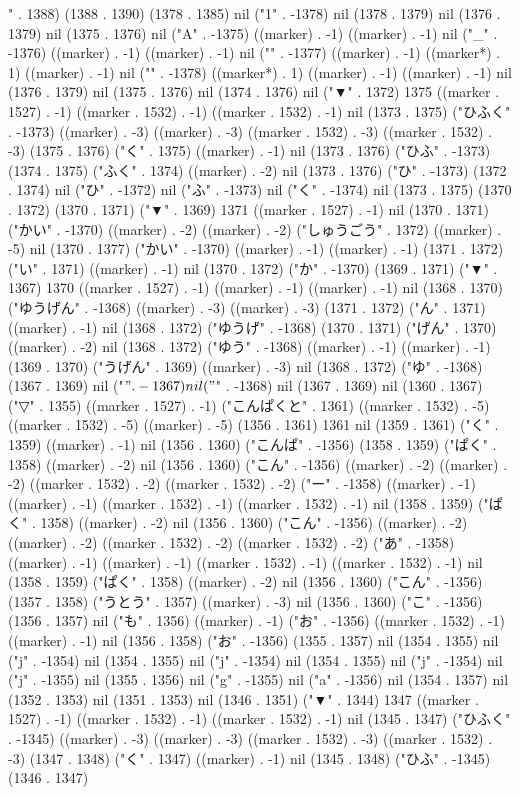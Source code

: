 " . 1388) (1388 . 1390) (1378 . 1385) nil ("1" . -1378) nil (1378 . 1379) nil (1376 . 1379) nil (1375 . 1376) nil ("A" . -1375) ((marker) . -1) ((marker) . -1) nil ("_" . -1376) ((marker) . -1) ((marker) . -1) nil ("{" . -1377) ((marker) . -1) ((marker*) . 1) ((marker) . -1) nil ("}" . -1378) ((marker*) . 1) ((marker) . -1) ((marker) . -1) nil (1376 . 1379) nil (1375 . 1376) nil (1374 . 1376) nil ("▼" . 1372) 1375 ((marker . 1527) . -1) ((marker . 1532) . -1) ((marker . 1532) . -1) nil (1373 . 1375) ("ひふく" . -1373) ((marker) . -3) ((marker) . -3) ((marker . 1532) . -3) ((marker . 1532) . -3) (1375 . 1376) ("く" . 1375) ((marker) . -1) nil (1373 . 1376) ("ひふ" . -1373) (1374 . 1375) ("ふく" . 1374) ((marker) . -2) nil (1373 . 1376) ("ひ" . -1373) (1372 . 1374) nil ("ひ" . -1372) nil ("ふ" . -1373) nil ("く" . -1374) nil (1373 . 1375) (1370 . 1372) (1370 . 1371) ("▼" . 1369) 1371 ((marker . 1527) . -1) nil (1370 . 1371) ("かい" . -1370) ((marker) . -2) ((marker) . -2) ("しゅうごう" . 1372) ((marker) . -5) nil (1370 . 1377) ("かい" . -1370) ((marker) . -1) ((marker) . -1) (1371 . 1372) ("い" . 1371) ((marker) . -1) nil (1370 . 1372) ("か" . -1370) (1369 . 1371) ("▼" . 1367) 1370 ((marker . 1527) . -1) ((marker) . -1) ((marker) . -1) nil (1368 . 1370) ("ゆうげん" . -1368) ((marker) . -3) ((marker) . -3) (1371 . 1372) ("ん" . 1371) ((marker) . -1) nil (1368 . 1372) ("ゆうげ" . -1368) (1370 . 1371) ("げん" . 1370) ((marker) . -2) nil (1368 . 1372) ("ゆう" . -1368) ((marker) . -1) ((marker) . -1) (1369 . 1370) ("うげん" . 1369) ((marker) . -3) nil (1368 . 1372) ("ゆ" . -1368) (1367 . 1369) nil ("$" . -1367) nil ("$" . -1368) nil (1367 . 1369) nil (1360 . 1367) ("▽" . 1355) ((marker . 1527) . -1) ("こんぱくと" . 1361) ((marker . 1532) . -5) ((marker . 1532) . -5) ((marker) . -5) (1356 . 1361) 1361 nil (1359 . 1361) ("く" . 1359) ((marker) . -1) nil (1356 . 1360) ("こんぱ" . -1356) (1358 . 1359) ("ぱく" . 1358) ((marker) . -2) nil (1356 . 1360) ("こん" . -1356) ((marker) . -2) ((marker) . -2) ((marker . 1532) . -2) ((marker . 1532) . -2) ("ー" . -1358) ((marker) . -1) ((marker) . -1) ((marker . 1532) . -1) ((marker . 1532) . -1) nil (1358 . 1359) ("ぱく" . 1358) ((marker) . -2) nil (1356 . 1360) ("こん" . -1356) ((marker) . -2) ((marker) . -2) ((marker . 1532) . -2) ((marker . 1532) . -2) ("あ" . -1358) ((marker) . -1) ((marker) . -1) ((marker . 1532) . -1) ((marker . 1532) . -1) nil (1358 . 1359) ("ぱく" . 1358) ((marker) . -2) nil (1356 . 1360) ("こん" . -1356) (1357 . 1358) ("うとう" . 1357) ((marker) . -3) nil (1356 . 1360) ("こ" . -1356) (1356 . 1357) nil ("も" . 1356) ((marker) . -1) ("お" . -1356) ((marker . 1532) . -1) ((marker) . -1) nil (1356 . 1358) ("お" . -1356) (1355 . 1357) nil (1354 . 1355) nil ("j" . -1354) nil (1354 . 1355) nil ("j" . -1354) nil (1354 . 1355) nil ("j" . -1354) nil ("j" . -1355) nil (1355 . 1356) nil ("g" . -1355) nil ("a" . -1356) nil (1354 . 1357) nil (1352 . 1353) nil (1351 . 1353) nil (1346 . 1351) ("▼" . 1344) 1347 ((marker . 1527) . -1) ((marker . 1532) . -1) ((marker . 1532) . -1) nil (1345 . 1347) ("ひふく" . -1345) ((marker) . -3) ((marker) . -3) ((marker . 1532) . -3) ((marker . 1532) . -3) (1347 . 1348) ("く" . 1347) ((marker) . -1) nil (1345 . 1348) ("ひふ" . -1345) (1346 . 1347) 